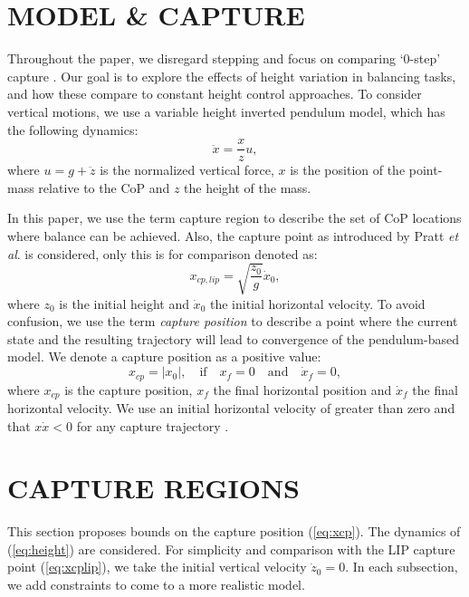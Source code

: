 \documentclass[letterpaper, 10 pt, conference]{ieeeconf}  %
\begin{document}
\section{MODEL \& CAPTURE}\label{sec:models}
Throughout the paper, we disregard stepping and focus on comparing `0-step' capture \cite{koolen2012capturability}. Our goal is to explore the effects of height variation in balancing tasks, and how these compare to constant height control approaches. To consider vertical motions, we use a variable height inverted pendulum model, which has the following dynamics:
\begin{equation}
	\ddot{x} = \frac{x}{z}u,
	\label{eq:height}
\end{equation}
where $u=g+\ddot{z}$ is the normalized vertical force, $x$ is the position of the point-mass relative to the CoP and $z$ the height of the mass.

In this paper, we use the term capture region \cite{pratt2006capture} to describe the set of CoP locations where balance can be achieved. Also, the capture point as introduced by Pratt \textit{et al}. is considered, only this is for comparison denoted as:
\begin{equation}
	x_{cp,lip} = \sqrt{\frac{z_0}{g}}\dot{x}_0,
	\label{eq:xcplip}
\end{equation}
where $z_0$ is the initial height and $\dot{x}_0$ the initial horizontal velocity. To avoid confusion, we use the term \textit{capture position} to describe a point where the current state and the resulting trajectory will lead to convergence of the pendulum-based model. We denote a capture position as a positive value:
\begin{equation}
	x_{cp}= |x_0|,\quad \text{if} \quad x_f=0 \quad \text{and} \quad \dot{x}_f=0,
	\label{eq:xcp}
\end{equation}
where $x_{cp}$ is the capture position, $x_f$ the final horizontal position and $\dot{x}_f$ the final horizontal velocity. We use an initial horizontal velocity of greater than zero and that $x\dot{x} < 0$ for any capture trajectory \cite{koolen2016balance}.

\section{CAPTURE REGIONS}\label{sec:regions}
This section proposes bounds on the capture position (\ref{eq:xcp}). The dynamics of (\ref{eq:height}) are considered. For simplicity and comparison with the LIP capture point (\ref{eq:xcplip}), we take the initial vertical velocity $\dot{z}_0=0$. In each subsection, we add constraints to come to a more realistic model. 
\end{document}
